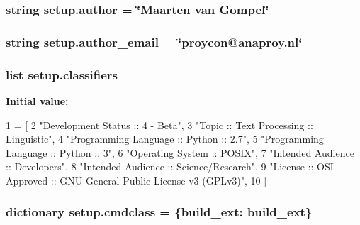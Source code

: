 \subsubsection[{author}]{\setlength{\rightskip}{0pt plus 5cm}string setup.\+author = \char`\"{}Maarten van Gompel\char`\"{}}\label{namespacesetup_ac83393287a89728d636e4ae9f4ac914f}
\hypertarget{namespacesetup_aa144ac52ed417d5c65d7377e0e75673e}{}
\subsubsection[{author\+\_\+email}]{\setlength{\rightskip}{0pt plus 5cm}string setup.\+author\+\_\+email = \char`\"{}proycon@anaproy.\+nl\char`\"{}}\label{namespacesetup_aa144ac52ed417d5c65d7377e0e75673e}
\hypertarget{namespacesetup_a2d96dddd66b7833bbb2db38dbbe55a02}{}
\subsubsection[{classifiers}]{\setlength{\rightskip}{0pt plus 5cm}list setup.\+classifiers}\label{namespacesetup_a2d96dddd66b7833bbb2db38dbbe55a02}
{\bfseries Initial value\+:}
\begin{DoxyCode}
1 = [
2         \textcolor{stringliteral}{"Development Status :: 4 - Beta"},
3         \textcolor{stringliteral}{"Topic :: Text Processing :: Linguistic"},
4         \textcolor{stringliteral}{"Programming Language :: Python :: 2.7"},
5         \textcolor{stringliteral}{"Programming Language :: Python :: 3"},
6         \textcolor{stringliteral}{"Operating System :: POSIX"},
7         \textcolor{stringliteral}{"Intended Audience :: Developers"},
8         \textcolor{stringliteral}{"Intended Audience :: Science/Research"},
9         \textcolor{stringliteral}{"License :: OSI Approved :: GNU General Public License v3 (GPLv3)"},
10     ]
\end{DoxyCode}
\hypertarget{namespacesetup_ad23e0b4fd9e5e6f20f8313d75832d1e2}{}
\subsubsection[{cmdclass}]{\setlength{\rightskip}{0pt plus 5cm}dictionary setup.\+cmdclass = \{\textquotesingle{}build\+\_\+ext\textquotesingle{}\+: build\+\_\+ext\}}\label{namespacesetup_ad23e0b4fd9e5e6f20f8313d75832d1e2}
\hypertarget{namespacesetup_aa4fb878ed283f922b9ad84355a3b7dbf}{}
